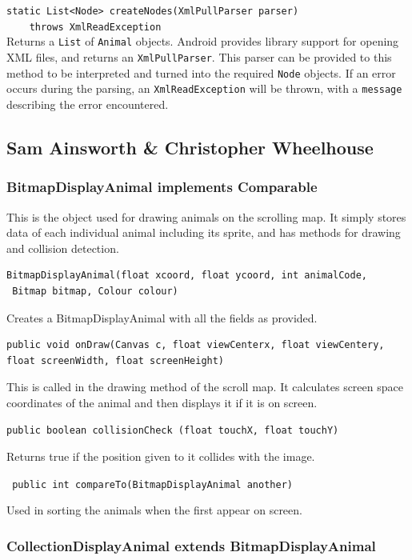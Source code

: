 \documentclass[12pt,a4paper,twoside]{article}
\begin{document}
\verb|static List<Node> createNodes(XmlPullParser parser)|\\
\verb|    throws XmlReadException|\\
Returns a \verb|List| of \verb|Animal| objects. Android provides library support for opening XML files, and returns an \verb|XmlPullParser|. This parser can be provided to this method to be interpreted and turned into the required \verb|Node| objects. If an error occurs during the parsing, an \verb|XmlReadException| will be thrown, with a \verb|message| describing the error encountered.

\subsection{Sam Ainsworth \& Christopher Wheelhouse}


\subsubsection{BitmapDisplayAnimal implements Comparable}

This is the object used for drawing animals on the scrolling map. It simply stores data of each individual animal including its sprite, and has methods for drawing and collision detection.

\begin{verbatim}
BitmapDisplayAnimal(float xcoord, float ycoord, int animalCode,
 Bitmap bitmap, Colour colour)
\end{verbatim}

Creates a BitmapDisplayAnimal with all the fields as provided.

\begin{verbatim}
public void onDraw(Canvas c, float viewCenterx, float viewCentery, 
float screenWidth, float screenHeight)
\end{verbatim}

This is called in the drawing method of the scroll map. It calculates screen space coordinates of the animal and then displays it if it is on screen.

\verb£public boolean collisionCheck (float touchX, float touchY)£

Returns true if the position given to it collides with the image.

\verb£ public int compareTo(BitmapDisplayAnimal another)£

Used in sorting the animals when the first appear on screen.

\subsubsection{CollectionDisplayAnimal extends BitmapDisplayAnimal}
\end{document}
